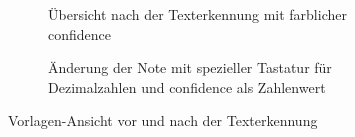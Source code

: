 \documentclass[notables, nomenclature, oneside, 150]{HSMW-Thesis}
\begin{document}
\begin{figure}[th]
\begin{subfigure}[t]{0.3\textwidth}
        			\caption{Übersicht nach der Texterkennung mit farblicher confidence}
        			\label{fig:ocr2}
    			\end{subfigure}
    			\begin{subfigure}[t]{0.3\textwidth}
        			\caption{Änderung der Note mit spezieller Tastatur für Dezimalzahlen und confidence als Zahlenwert}
        			\label{fig:ocr3}
    			\end{subfigure}
    			\caption{Vorlagen-Ansicht vor und nach der Texterkennung}
				\label{fig:ocr}
			\end{figure}
			
\end{document}
